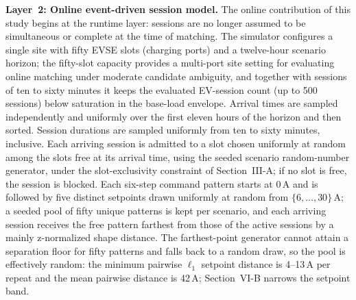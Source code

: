 \documentclass{ieeeaccess}
\newif\ifhighlight \highlightfalse
\DeclareRobustCommand{\revised}[1]{\ifhighlight{\color{blue}#1}\else{\color{.}#1}\fi}
\begin{document}
    \textbf{Layer~2: Online event-driven session model.}
    The online contribution of this study begins at the runtime layer: sessions are no longer assumed to be simultaneous or complete at the time of matching.
    The simulator configures a single site with fifty EVSE slots (charging ports) and a twelve-hour scenario horizon; the fifty-slot capacity provides a multi-port site setting for evaluating online matching under moderate candidate ambiguity, and together with sessions of ten to sixty minutes it keeps the evaluated EV-session count (up to 500 sessions) below saturation in the \revised{base-load} envelope.
    Arrival times are sampled independently and uniformly over the first eleven hours of the horizon and then sorted. Session durations are sampled uniformly from ten to sixty minutes, inclusive. Each arriving session is admitted to a slot chosen uniformly at random among the slots free at its arrival time, using the seeded scenario random-number generator, under the slot-exclusivity constraint of Section~III-A; if no slot is free, the session is blocked.
    Each six-step command pattern starts at $0$\,A and is followed by five distinct setpoints drawn \revised{uniformly at random} from $\{6,\dots,30\}$\,A\revised{; a seeded pool of fifty unique patterns is kept per scenario, and each arriving session receives the free pattern farthest from those of the active sessions by a mainly z-normalized shape distance.
    The farthest-point generator cannot attain a separation floor for fifty patterns and falls back to a random draw, so the pool is effectively random: the minimum pairwise $\ell_1$ setpoint distance is 4--13\,A per repeat and the mean pairwise distance is 42\,A; Section~VI-B narrows the setpoint band.}
\end{document}
